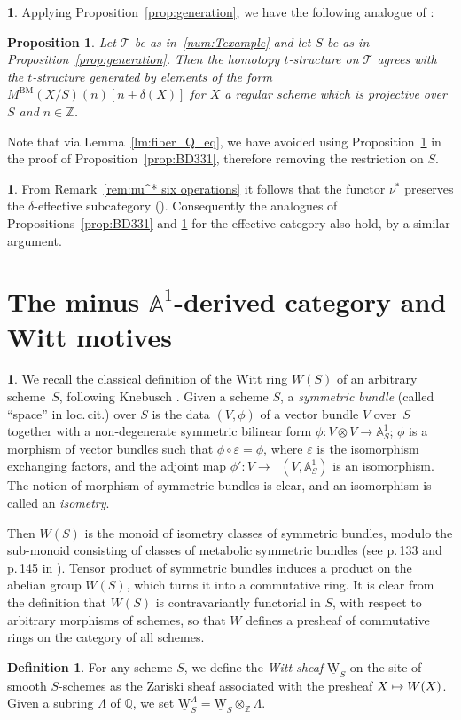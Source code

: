 \documentclass[JEP,XML,SOM,Unicode]{cedram}
\def\mto{\mathchoice{\longmapsto}{\mapsto}{\mapsto}{\mapsto}}
\let\epsilon\varepsilon
\newcommand{\tstructure}{$t$-structure\xspace}
\newcommand{\T}{\mathscr T}
\renewcommand{\AA}{\mathbb A}
\newcommand{\uW}{\underline{\mathrm W}}
\DeclareMathOperator{\uHom}{\underline{Hom}}
\newcommand{\ZZ} {\mathbb Z}
\newcommand{\QQ} {\mathbb Q}
\newtheorem{prop}[thm]{Proposition}
\theoremstyle{remark}
\theoremstyle{definition}
\newtheorem{df}[thm]{Definition}
\newtheorem{num}[thm]{}
\numberwithin{equation}{thm}
\begin{document}
\begin{num}
Applying Proposition~\ref{prop:generation}, we have the following analogue of \cite[Th.\,2.4.3]{BD1}:
\begin{prop}
\label{prop:BD243}
Let $\T$ be as in~\ref{num:Texample} and let $S$ be as in Proposition~\ref{prop:generation}. Then the homotopy \tstructure on $\T$ agrees with the \tstructure generated by elements of the form $M^{\mathrm{BM}}(X/S)(n)[n+\delta(X)]$ for $X$ a regular scheme which is projective over $S$ and $n\in\ZZ$.
\end{prop}
Note that via Lemma~\ref{lm:fiber_Q_eq}, we have avoided using Proposition~\ref{prop:BD243} in the proof of Proposition~\ref{prop:BD331}, therefore removing the restriction on $S$.
\end{num}

\begin{num}
\label{num:eff_cat}
From Remark~\ref{rem:nu^* six operations} it follows that the functor $\nu^*$ preserves the $\delta$-effective subcategory (\cite[Def.\,2.2.1]{BD1}). Consequently the analogues of Propositions~\ref{prop:BD331} and \ref{prop:BD243} for the effective category also hold, by a similar argument.
\end{num}

\section{The minus \texorpdfstring{$\AA^1$}{A1}-derived category and Witt motives}
\label{sec:W}

\begin{num}\label{num:symm_bdl}
We recall the classical definition of the Witt ring $W(S)$ of an arbitrary scheme~$S$,
following Knebusch \cite[I, \S 5]{Kne}.
Given a scheme $S$, a \emph{symmetric bundle} (called ``space'' in loc.\,cit.)
over $S$ is the data $(V,\phi)$ of a vector bundle $V$ over~$S$
together with a non-degenerate symmetric bilinear form $\phi:V \otimes V \to \AA^1_S$;
\ie $\phi$ is a morphism of vector bundles such that $\phi \circ \epsilon=\phi$, where $\epsilon$ is the
isomorphism exchanging factors, and the adjoint map $\phi':V \to \uHom(V,\AA^1_S)$ is an isomorphism.
The notion of morphism of symmetric bundles is clear, and an isomorphism is called an \emph{isometry}.

Then $W(S)$ is the monoid of isometry classes of symmetric bundles, modulo the sub-monoid consisting of classes of metabolic symmetric bundles (see p.\,133 and p.\,145 in \cite{Kne}). Tensor product of symmetric bundles induces a product on the abelian group $W(S)$, which turns it into a commutative ring.
It is clear from the definition that $W(S)$ is contravariantly functorial in $S$, with respect to arbitrary morphisms of schemes, so that $W$ defines a presheaf of commutative rings on the category of all schemes.
\end{num}
\begin{df}\label{df:unramified_Witt}
For any scheme $S$, we define the \emph{Witt sheaf} $\uW_S$ on the site of smooth $S$-schemes as the Zariski sheaf associated with the presheaf $X \mto W(X)$.
Given a subring $\Lambda$ of $\QQ$, we set $\uW_S^\Lambda=\uW_S \otimes_\ZZ \Lambda$.
\end{df}
\end{document}
